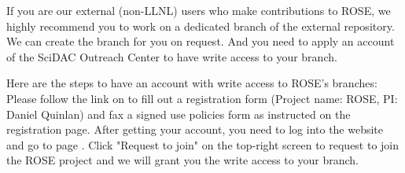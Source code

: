If you are our external (non-LLNL) users who make contributions to ROSE,
we highly recommend you to work on a dedicated branch of the external repository. 
We can create the branch for you on request. And you need to apply an account of
the SciDAC Outreach Center to have write access to your branch. 

Here are the steps to have an account with write access to ROSE's branches:
Please follow the link on
to fill out a registration form (Project name: ROSE, PI: Daniel Quinlan)
and fax a signed use policies form as instructed on the registration page.
After getting your account, you need to log into the website and go to page
.
Click "Request to join" on the top-right screen to request to join the ROSE
project and we will grant you the write access to your branch. 

